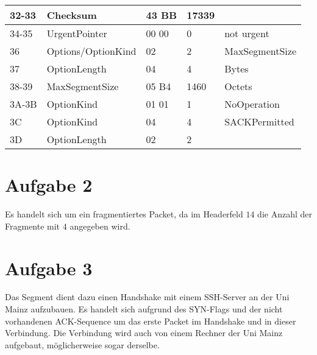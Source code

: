 \begin{tabular}{|l|l|l|l|l|}
32-33 & Checksum & 43 BB & 17339 & \\\hline
34-35 & UrgentPointer & 00 00 & 0 & not urgent \\\hline
36 & Options/OptionKind & 02 & 2 & MaxSegmentSize \\\hline
37 & OptionLength & 04 & 4 & Bytes \\\hline
38-39 & MaxSegmentSize & 05 B4 & 1460 & Octets \\\hline
3A-3B & OptionKind & 01 01 & 1 & NoOperation \\\hline
3C & OptionKind & 04 & 4 & SACKPermitted \\\hline
3D & OptionLength & 02 & 2 & \\\hline
\end{tabular}

\section{Aufgabe 2}
Es handelt sich um ein fragmentiertes Packet, da im Headerfeld $14$ die Anzahl der Fragmente mit $4$ angegeben wird.

\section{Aufgabe 3}
Das Segment dient dazu einen Handshake mit einem SSH-Server an der Uni Mainz aufzubauen. Es handelt sich aufgrund des SYN-Flags und der nicht vorhandenen ACK-Sequence um das erste Packet im Handshake und in dieser Verbindung. Die Verbindung wird auch von einem Rechner der Uni Mainz aufgebaut, möglicherweise sogar derselbe.
